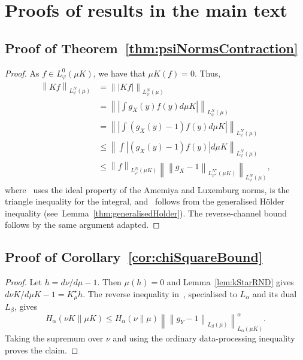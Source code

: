 \documentclass[11pt]{article}
\theoremstyle{plain}
\theoremstyle{remark}
\begin{document}
\section{Proofs of results in the main text}

\subsection{Proof of Theorem~\ref{thm:psiNormsContraction}}\label{app:proofPsiNormsContraction}
      \begin{proof}
          As $f \in L_\varphi^0(\mu K)$, we have that $\mu K(f)=0$. Thus, 
    \begin{align}
        \left\lVert K f\right\rVert_{L_\psi^N(\mu)} &= \left\lVert |K f|\right\rVert_{L_\psi^N(\mu )} \label{eq:idealNorms}  \\
        &= \left\lVert\left| \int g_X(y) f(y) d\mu K \right| \right\rVert_{L_\psi^N(\mu )} \\
         &= \left\lVert\left| \int (g_X(y)-1) f(y) d\mu K \right| \right\rVert_{L_\psi^N(\mu )} \\ &\leq \left\lVert \int \left|(g_X(y)-1) f(y)\right| d\mu K \right\rVert_{L_\psi^N(\mu )} \label{eq:jensenMainThm}\\
         &\leq \left\lVert f\right\rVert_{L_\varphi^N(\mu K)}\left\lVert \left\lVert g_X-1\right\rVert_{L_{\varphi^\star}^{N^\star}(\mu K)}\right\rVert_{L_\psi^N(\mu )}\label{eq:genHolderMainThm},
    \end{align}
    where~ uses the ideal property of the
    Amemiya and Luxemburg norms,
     is the triangle inequality for the
    integral, and~ follows from the
    generalised H\"older inequality (see~Lemma~\ref{thm:generalisedHolder}).
    The reverse-channel bound follows by the same argument adapted.
      \end{proof}

\subsection{Proof of Corollary~\ref{cor:chiSquareBound}}\label{app:proofChiSquareBound}
\begin{proof}
Let $h=d\nu/d\mu-1$.  Then $\mu(h)=0$ and
Lemma~\ref{lem:kStarRND} gives
$d\nu K/d\mu K-1=K_\mu^\star h$.  The reverse inequality
in~, specialised to $L_\alpha$ and its
dual $L_\beta$, gives
\begin{equation}
H_\alpha(\nu K\|\mu K)
\leq
H_\alpha(\nu\|\mu)
\left\lVert
\left\lVert g_Y-1\right\rVert_{L_\beta(\mu)}
\right\rVert_{L_\alpha(\mu K)}^\alpha.
\end{equation}
Taking the supremum over $\nu$ and using the ordinary
data-processing inequality proves the claim.
\end{proof}
\end{document}
